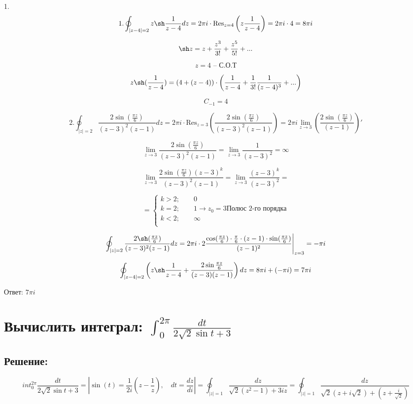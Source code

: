 \documentclass{article}
\begin{document}
1. 
\[
1. \oint_{|z - 4| = 2} z \sh \frac{1}{z - 4} dz = 2\pi i \cdot \text{Res}_{z=4}\left( z \frac{1}{z-4} \right) = 2\pi i \cdot 4 = 8\pi i
\]

\[
\sh z = z + \frac{z^3}{3!} + \frac{z^5}{5!} + ...
\]

\[
z = 4 \text{ – С.О.Т}
\]

\[
z\sh(\frac{1}{z-4}) = \left(4 + (z-4)\right) \cdot \left(\frac{1}{z-4} + \frac{1}{3!}  \frac{1}{(z-4)^3} + ... \right)
\]

\[
C_{-1}= 4
\]


\[
2.  \oint_{|z|=2} \frac{2 \sin (\frac{\pi z}{6})}{(z-3)^2(z-1)} dz = 2\pi i \cdot \text{Res}_{z = 3} \left( \frac{2 \sin (\frac{\pi z}{6})}{(z-3)^2(z-1)} \right) = 2 \pi i \lim_{z \to 3} \left(\frac{2 \sin(\frac{\pi z}{6})}{(z-1)} \right)'
\]

\[
\lim_{z \to 3} \frac{2 \sin(\frac{\pi z}{6})}{(z-3)^2(z-1)}  = \lim_{z \to 3} \frac{1}{(z-3)^2} = \infty
\]

\[
\lim_{z \to 3} \frac{2 \sin(\frac{\pi z}{6})(z-3)^k}{(z-3)^2(z-1)}  = \lim_{z \to 3} \frac{(z-3)^k}{(z-3)^2} = 
\]

\[
= \begin{cases} k > 2 ; \quad\quad 0\\
 k = 2 ; \quad\quad 1\rightarrow z_0 = 3 \text{Полюс 2-го порядка} \\ 
  k < 2 ; \quad\quad \infty\\
\end{cases}
\]

\[
\oint_{|z|=2} \frac{2 \sh (\frac{\pi z}{6})}{(z-3)^2(z-1)} dz = 2 \pi i \cdot 2 \frac{\cos (\frac{\pi z}{6}) \cdot \frac{\pi}{6} \cdot (z-1) \cdot \sin (\frac{\pi z}{6})}{(z-1)^2} \Bigg|_{z=3} = -\pi i
\]

\[
\oint_{|z - 4| = 2} \left( z \sh \frac{1}{z - 4} + \frac{2 \sin \frac{\pi z}{6}}{(z - 3)(z - 1)} \right) dz = 8\pi i + (-\pi i) = 7 \pi i
\]

Ответ: $7 \pi i$

\section{Вычислить интеграл: $\int_{0}^{2\pi} \frac{dt}{2\sqrt{2} \sin t + 3}$}
\subsection{Решение:}

\[
int_{0}^{2\pi} \frac{dt}{2\sqrt{2} \sin t + 3} = \left|\sin(t) = \frac{1}{2i}(z-\frac{1}{z}), \quad dt = \frac{dz}{di}\right| = \oint_{|z|=1} \frac{dz}{\sqrt{2}(z^2 - 1) + 3iz} = \oint_{|z|=1} \frac{dz}{\sqrt{2}(z + i\sqrt{2}) + (z + \frac{i}{\sqrt{2}})}
\]
\end{document}
